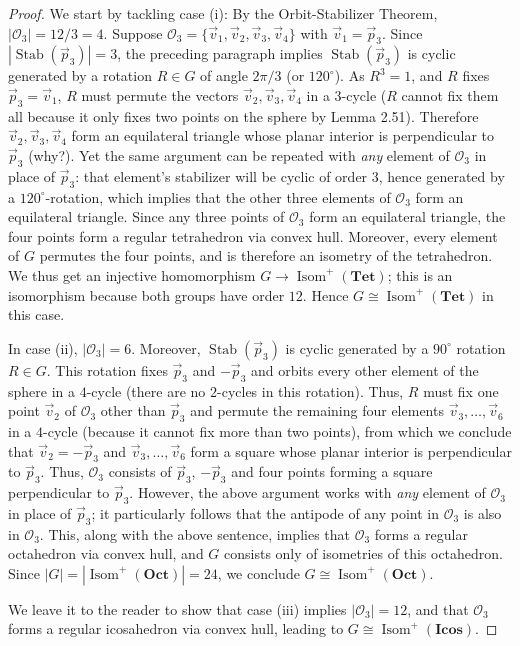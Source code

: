 \documentclass[leqno]{book}
\begin{document}
\begin{proof}
We start by tackling case (i): By the Orbit-Stabilizer Theorem, $|\mathcal O_3|=12/3=4$.  Suppose $\mathcal O_3=\{\vec v_1,\vec v_2,\vec v_3,\vec v_4\}$ with $\vec v_1=\vec p_3$.  Since $|\operatorname{Stab}(\vec p_3)|=3$, the preceding paragraph implies $\operatorname{Stab}(\vec p_3)$ is cyclic generated by a rotation $R\in G$ of angle $2\pi/3$ (or $120^\circ$).  As $R^3=1$, and $R$ fixes $\vec p_3=\vec v_1$, $R$ must permute the vectors $\vec v_2,\vec v_3,\vec v_4$ in a $3$-cycle ($R$ cannot fix them all because it only fixes two points on the sphere by Lemma 2.51).  Therefore $\vec v_2,\vec v_3,\vec v_4$ form an equilateral triangle whose planar interior is perpendicular to $\vec p_3$ (why?).  Yet the same argument can be repeated with \emph{any} element of $\mathcal O_3$ in place of $\vec p_3$: that element's stabilizer will be cyclic of order $3$, hence generated by a $120^\circ$-rotation, which implies that the other three elements of $\mathcal O_3$ form an equilateral triangle.  Since any three points of $\mathcal O_3$ form an equilateral triangle, the four points form a regular tetrahedron via convex hull.  Moreover, every element of $G$ permutes the four points, and is therefore an isometry of the tetrahedron.  We thus get an injective homomorphism $G\to\operatorname{Isom}^+(\mathbf{Tet})$; this is an isomorphism because both groups have order $12$.  Hence $G\cong\operatorname{Isom}^+(\mathbf{Tet})$ in this case.

In case (ii), $|\mathcal O_3|=6$.  Moreover, $\operatorname{Stab}(\vec p_3)$ is cyclic generated by a $90^\circ$ rotation $R\in G$.  This rotation fixes $\vec p_3$ and $-\vec p_3$ and orbits every other element of the sphere in a $4$-cycle (there are no $2$-cycles in this rotation).  Thus, $R$ must fix one point $\vec v_2$ of $\mathcal O_3$ other than $\vec p_3$ and permute the remaining four elements $\vec v_3,\dots,\vec v_6$ in a $4$-cycle (because it cannot fix more than two points), from which we conclude that $\vec v_2=-\vec p_3$ and $\vec v_3,\dots,\vec v_6$ form a square whose planar interior is perpendicular to $\vec p_3$.  Thus,
$\mathcal O_3$ consists of $\vec p_3$, $-\vec p_3$ and four points forming a square perpendicular to $\vec p_3$.
However, the above argument works with \emph{any} element of $\mathcal O_3$ in place of $\vec p_3$; it particularly follows that the antipode of any point in $\mathcal O_3$ is also in $\mathcal O_3$.  This, along with the above sentence, implies that $\mathcal O_3$ forms a regular octahedron via convex hull, and $G$ consists only of isometries of this octahedron.  Since $|G|=|\operatorname{Isom}^+(\mathbf{Oct})|=24$, we conclude $G\cong\operatorname{Isom}^+(\mathbf{Oct})$.

We leave it to the reader to show that case (iii) implies $|\mathcal O_3|=12$, and that $\mathcal O_3$ forms a regular icosahedron via convex hull, leading to $G\cong\operatorname{Isom}^+(\mathbf{Icos})$.
\end{proof}
\end{document}
